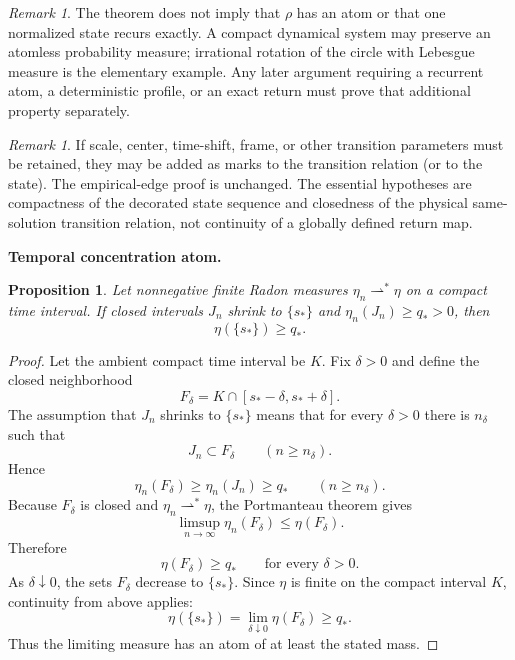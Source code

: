 \documentclass[11pt]{article}
\newtheorem{proposition}[theorem]{Proposition}
\theoremstyle{definition}\newtheorem{definition}[theorem]{Definition}
\theoremstyle{remark}\newtheorem{remark}[theorem]{Remark}
\begin{document}
\begin{remark}\label{rem:atomless-stationary}
The theorem does not imply that $\rho$ has an atom or that one normalized
state recurs exactly.  A compact dynamical system may preserve an atomless
probability measure; irrational rotation of the circle with Lebesgue measure
is the elementary example.  Any later argument requiring a recurrent atom,
a deterministic profile, or an exact return must prove that additional
property separately.
\end{remark}

\begin{remark}\label{rem:transition-parameters}
If scale, center, time-shift, frame, or other transition parameters must be
retained, they may be added as marks to the transition relation (or to the
state).  The empirical-edge proof is unchanged.  The essential hypotheses are
compactness of the decorated state sequence and closedness of the physical
same-solution transition relation, not continuity of a globally defined
return map.
\end{remark}

\medskip
\noindent\textbf{Temporal concentration atom.}
\begin{proposition}\label{prop:time-atom}
Let nonnegative finite Radon measures $\eta_n\rightharpoonup^*\eta$ on a compact
time interval.  If closed intervals $J_n$ shrink to $\{s_*\}$ and
$\eta_n(J_n)\ge q_*>0$, then
\[
\boxed{\eta(\{s_*\})\ge q_*.}
\]
\end{proposition}
\begin{proof}
Let the ambient compact time interval be $K$.  Fix $\delta>0$ and define the
closed neighborhood
\[
F_\delta=K\cap[s_*-\delta,s_*+\delta].
\]
The assumption that $J_n$ shrinks to $\{s_*\}$ means that for every
$\delta>0$ there is $n_\delta$ such that
\[
J_n\subset F_\delta
\qquad(n\ge n_\delta).
\]
Hence
\[
\eta_n(F_\delta)\ge\eta_n(J_n)\ge q_*
\qquad(n\ge n_\delta).
\]
Because $F_\delta$ is closed and $\eta_n\rightharpoonup^*\eta$, the
Portmanteau theorem gives
\[
\limsup_{n\to\infty}\eta_n(F_\delta)\le\eta(F_\delta).
\]
Therefore
\[
\eta(F_\delta)\ge q_*
\qquad\text{for every }\delta>0.
\]
As $\delta\downarrow0$, the sets $F_\delta$ decrease to $\{s_*\}$.  Since
$\eta$ is finite on the compact interval $K$, continuity from above applies:
\[
\eta(\{s_*\})
=\lim_{\delta\downarrow0}\eta(F_\delta)
\ge q_*.
\]
Thus the limiting measure has an atom of at least the stated mass.
\end{proof}
\end{document}
